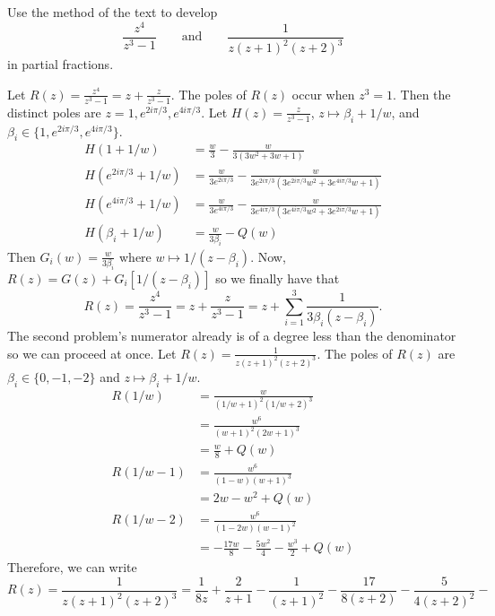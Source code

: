\begin{exercise}
\item
  Use the method of the text to develop
  \[
  \frac{z^4}{z^3 - 1}\qquad\text{and}\qquad\frac{1}{z(z + 1)^2(z + 2)^3}
  \]
  in partial fractions.
  \par\smallskip
  Let \(R(z) = \frac{z^4}{z^3 - 1} = z + \frac{z}{z^3 - 1}\).
  The poles of \(R(z)\) occur when \(z^3 = 1\).
  Then the distinct poles are \(z = 1,e^{2i\pi/3},e^{4i\pi/3}\).
  Let \(H(z) = \frac{z}{z^3 - 1}\), \(z\mapsto\beta_i + 1/w\), and
  \(\beta_i\in\{1,e^{2i\pi/3},e^{4i\pi/3}\}\).
  \begin{align*}
    H(1 + 1/w) & = \frac{w}{3} - \frac{w}{3(3w^2 + 3w + 1)}\\
    H(e^{2i\pi/3} + 1/w)
               & = \frac{w}{3e^{2i\pi/3}} - \frac{w}{3e^{2i\pi/3}
                 (3e^{2i\pi/3}w^2 + 3e^{4i\pi/3}w + 1)}\\
    H(e^{4i\pi/3} + 1/w)
               & = \frac{w}{3e^{4i\pi/3}} - \frac{w}{3e^{4i\pi/3}
                 (3e^{4i\pi/3}w^2 + 3e^{2i\pi/3}w + 1)}\\
    H(\beta_i + 1/w) & = \frac{w}{3\beta_i} - Q(w)
  \end{align*}
  Then \(G_i(w) = \frac{w}{3\beta_i}\) where \(w\mapsto 1/(z - \beta_i)\).
  Now, \(R(z) = G(z) + G_i[1/(z - \beta_i)]\) so we finally have that
  \[
  R(z) = \frac{z^4}{z^3 - 1} = z + \frac{z}{z^3 - 1} =
  z + \sum_{i = 1}^3\frac{1}{3\beta_i(z - \beta_i)}.
  \]
  The second problem's numerator already is of a degree less than the
  denominator so we can proceed at once.
  Let \(R(z) = \frac{1}{z(z + 1)^2(z + 2)^3}\).
  The poles of \(R(z)\) are \(\beta_i\in\{0,-1,-2\}\) and
  \(z\mapsto \beta_i + 1/w\).
  \begin{align*}
    R(1/w) & = \frac{w}{(1/w + 1)^2(1/w + 2)^3}\\
           & = \frac{w^6}{(w + 1)^2(2w + 1)^3}\\
           & = \frac{w}{8} + Q(w)\\
    R(1/w - 1) & = \frac{w^6}{(1 - w)(w + 1)^3}\\
           & = 2w - w^2 + Q(w)\\
    R(1/w - 2) & = \frac{w^6}{(1 - 2w)(w - 1)^2}\\
           & = -\frac{17w}{8} - \frac{5w^2}{4} - \frac{w^3}{2} + Q(w)
  \end{align*}
  Therefore, we can write
  \[
  R(z) = \frac{1}{z(z + 1)^2(z + 2)^3} = \frac{1}{8z} + \frac{2}{z + 1} -
  \frac{1}{(z + 1)^2} - \frac{17}{8(z + 2)} - \frac{5}{4(z + 2)^2} -
\]
\end{exercise}
